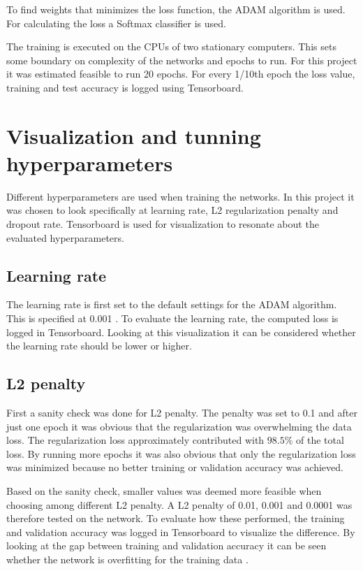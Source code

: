 To find weights that minimizes the loss function, the ADAM algorithm is used. For calculating the loss a Softmax classifier is used.

The training is executed on the CPUs of two stationary computers. This sets some boundary on complexity of the networks and epochs to run. For this project it was estimated feasible to run 20 epochs. For every 1/10th epoch the loss value, training and test accuracy is logged using Tensorboard.

\section{Visualization and tunning hyperparameters}
Different hyperparameters are used when training the networks. In this project it was chosen to look specifically at learning rate, L2 regularization penalty and dropout rate. Tensorboard is used for visualization to resonate about the evaluated hyperparameters.

\subsection{Learning rate}
The learning rate is first set to the default settings for the ADAM algorithm. This is specified at 0.001 \citep{ADAM}. To evaluate the learning rate, the computed loss is logged in Tensorboard. Looking at this visualization it can be considered whether the learning rate should be lower or higher.


\subsection{L2 penalty}
First a sanity check was done for L2 penalty. The penalty was set to 0.1 and after just one epoch it was obvious that the regularization was overwhelming the data loss. The regularization loss approximately contributed with $98.5\%$ of the total loss. By running more epochs it was also obvious that only the regularization loss was minimized because no better training or validation accuracy was achieved.

Based on the sanity check, smaller values was deemed more feasible when choosing among different L2 penalty. A L2 penalty of 0.01, 0.001 and 0.0001 was therefore tested on the network. To evaluate how these performed, the training and validation accuracy was logged in Tensorboard to visualize the difference. By looking at the gap between training and validation accuracy it can be seen whether the network is overfitting for the training data \citep{NN3}.

